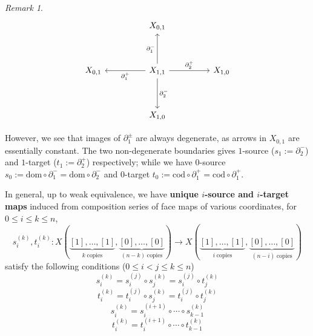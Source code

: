 \documentclass{article}
\theoremstyle{definition}
\theoremstyle{remark}
\newtheorem*{remark}{Remark}
\begin{document}
\begin{remark}
$$\begin{tikzcd}[column sep=huge,row sep=huge] 
\phantom{a}
& X_{0,1}
& \phantom{a} \\
X_{0,1}
& X_{1,1}
    \arrow[u,"\partial^{-}_1"]
    \arrow[l,"\partial^{+}_1"]
    \arrow[d,"\partial^{-}_2"]
    \arrow[r,"\partial^{+}_2"]
& X_{1,0} \\ 
\phantom{a}
& X_{1,0}
\end{tikzcd}$$

\begin{center}
\end{center}

However, we see that images of $\partial^{\pm}_1$ are always degenerate, as arrows in $X_{0,1}$ are essentially constant. The two non-degenerate boundaries gives $1$-source ($s_1:=\partial^{-}_2$) and $1$-target ($t_1:=\partial^{+}_2$) respectively; while we have  $0$-source $s_0:=\mathrm{dom} \circ \partial^{-}_1 = \mathrm{dom} \circ \partial^{-}_2$ and $0$-target $t_0:=\mathrm{cod} \circ \partial^{+}_1 = \mathrm{cod} \circ \partial^{+}_1$.

In general, up to weak equivalence, we have \textbf{unique $i$-source and $i$-target maps} induced from composition series of face maps of various coordinates, for $0 \leq i \leq k \leq n$, $$ s^{(k)}_i,t^{(k)}_i:X({\underbrace{[1],\dots,[1]}_{k \; \text{copies}},\underbrace{[0],\dots,[0]}_{(n-k) \; \text{copies}}}) \to X({\underbrace{[1],\dots,[1]}_{i \; \text{copies}},\underbrace{[0],\dots,[0]}_{(n-i) \; \text{copies}}}) $$ satisfy the following conditions ($0 \leq i < j \leq k \leq n$)
$$ s^{(k)}_i=s^{(j)}_i \circ s^{(k)}_j = s^{(j)}_i \circ t^{(k)}_j $$
$$ t^{(k)}_i=t^{(j)}_i \circ s^{(k)}_j = t^{(j)}_i \circ t^{(k)}_j $$
$$ s^{(k)}_i=s^{(i+1)}_i \circ \cdots \circ s^{(k)}_{k-1} $$
$$ t^{(k)}_i=t^{(i+1)}_i \circ \cdots \circ t^{(k)}_{k-1} $$


\end{remark}
\end{document}
